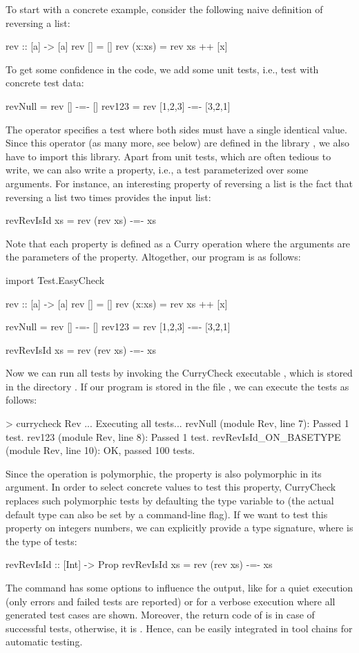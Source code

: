 To start with a concrete example, consider the following naive definition of
reversing a list:
\begin{curry}
rev :: [a] -> [a]
rev []     = []
rev (x:xs) = rev xs ++ [x]
\end{curry}
To get some confidence in the code, we add some unit tests,
i.e., test with concrete test data:
\begin{curry}
revNull = rev []      -=- []
rev123  = rev [1,2,3] -=- [3,2,1]
\end{curry}
The operator \ccode{-=-} specifies a test where both sides must
have a single identical value. Since this operator (as many more, see below)
are defined in the library ,
we also have to import this library.
Apart from unit tests, which are often tedious to write,
we can also write a property, i.e., a test parameterized over
some arguments. For instance, an interesting property of reversing a list
is the fact that reversing a list two times provides the input list:
\begin{curry}
revRevIsId xs = rev (rev xs) -=- xs
\end{curry}
Note that each property is defined as a Curry operation
where the arguments are the parameters of the property.
Altogether, our program is as follows:
\begin{curry}
import Test.EasyCheck

rev :: [a] -> [a]
rev []     = []
rev (x:xs) = rev xs ++ [x]

revNull = rev []      -=- []
rev123  = rev [1,2,3] -=- [3,2,1]

revRevIsId xs = rev (rev xs) -=- xs
\end{curry}
Now we can run all tests by invoking the CurryCheck executable
, which is stored in the directory .
If our program is stored in the file ,
we can execute the tests as follows:
\begin{curry}
> currycheck Rev
...
Executing all tests...
revNull (module Rev, line 7):
 Passed 1 test.
rev123 (module Rev, line 8):
 Passed 1 test.
revRevIsId_ON_BASETYPE (module Rev, line 10):
 OK, passed 100 tests.
\end{curry}
Since the operation  is polymorphic,
the property  is also polymorphic in its argument.
In order to select concrete values to test this property,
CurryCheck replaces such polymorphic tests by defaulting the type
variable to  (the actual default type can also be set by a
command-line flag).
If we want to test this property on integers numbers,
we can explicitly provide a type signature,
where  is the type of tests:
\begin{curry}
revRevIsId :: [Int] -> Prop
revRevIsId xs = rev (rev xs) -=- xs
\end{curry}
The command  has some options to influence
the output, like  for a quiet execution
(only errors and failed tests are reported) or
 for a verbose execution where all generated test cases
are shown.
Moreover, the return code of  is 
in case of successful tests, otherwise, it is .
Hence,  can be easily integrated in tool chains
for automatic testing.

